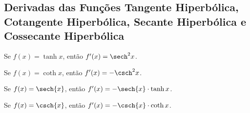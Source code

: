 \subsection{Derivadas das Funções Tangente Hiperbólica, Cotangente Hiperbólica, Secante Hiperbólica e Cossecante Hiperbólica}
\begin{frame}
  \begin{theorem}
    Se $f(x)=\tanh{x}$, então $f^{\prime}(x) = \sech^{2}{x}$.
  \end{theorem}
  \vfill
  \begin{theorem}
    Se $f(x)=\coth{x}$, então $f^{\prime}(x) = -\csch^{2}{x}$.
  \end{theorem}
  \vfill
  \begin{theorem}
    Se $f(x)=\sech{x}$, então $f^{\prime}(x) = -\sech{x}\cdot\tanh{x}$.
  \end{theorem}
  \vfill
  \begin{theorem}
    Se $f(x)=\csch{x}$, então $f^{\prime}(x) = -\csch{x}\cdot\coth{x}$.
  \end{theorem}
\end{frame}

